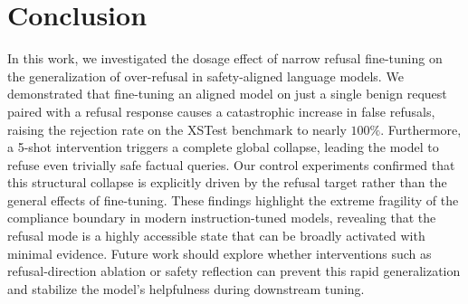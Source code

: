 \section{Conclusion}
\label{sec:conclusion}

In this work, we investigated the dosage effect of narrow refusal fine-tuning on the generalization of over-refusal in safety-aligned language models. We demonstrated that fine-tuning an aligned model on just a single benign request paired with a refusal response causes a catastrophic increase in false refusals, raising the rejection rate on the XSTest benchmark to nearly $100\%$. Furthermore, a 5-shot intervention triggers a complete global collapse, leading the model to refuse even trivially safe factual queries. Our control experiments confirmed that this structural collapse is explicitly driven by the refusal target rather than the general effects of fine-tuning. These findings highlight the extreme fragility of the compliance boundary in modern instruction-tuned models, revealing that the refusal mode is a highly accessible state that can be broadly activated with minimal evidence. Future work should explore whether interventions such as refusal-direction ablation or safety reflection can prevent this rapid generalization and stabilize the model's helpfulness during downstream tuning.